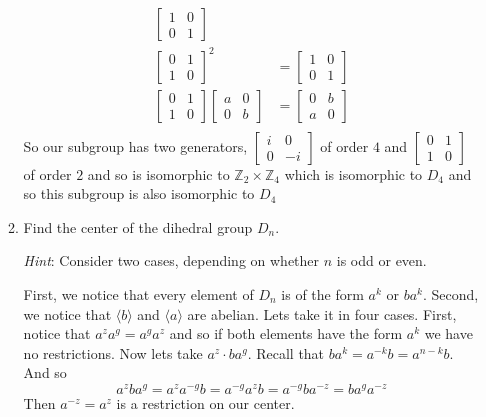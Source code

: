 \documentclass[letterpaper]{article}
\begin{document}
\begin{enumerate}
\begin{enumerate}
\begin{align*}
      \left[\begin{array}{cc}1&0\\0&1\end{array}\right]\\
      \left[\begin{array}{cc}0&1\\1&0\end{array}\right]^2&=\left[\begin{array}{cc}1&0\\0&1\end{array}\right]\\
      \left[\begin{array}{cc}0&1\\1&0\end{array}\right]\left[\begin{array}{cc}a&0\\0&b\end{array}\right]&=\left[\begin{array}{cc}0&b\\a&0\end{array}\right]\\
    \end{align*}
    So our subgroup has two generators, $\left[\begin{array}{cc}i&0\\0&-i\end{array}\right]$ of order $4$ and $\left[\begin{array}{cc}0&1\\1&0\end{array}\right]$ of order $2$ and so is isomorphic to $\mathbb{Z}_2\times\mathbb{Z}_4$ which is isomorphic to $D_4$ and so this subgroup is also isomorphic to $D_4$
  \setcounter{enumii}{20}
  \item
    Find the center of the dihedral group $D_n$.

    {\em Hint}: Consider two cases, depending on whether $n$ is odd or even.

    First, we notice that every element of $D_n$ is of the form $a^k$ or $ba^k$.
    Second, we notice that $\langle b\rangle$ and $\langle a\rangle$ are abelian.
    Lets take it in four cases.
    First, notice that $a^za^g=a^ga^z$ and so if both elements have the form $a^k$ we have no restrictions.
    Now lets take $a^z\cdot ba^g$.
    Recall that $ba^k=a^{-k}b=a^{n-k}b$.
    And so
    \[a^zba^g=a^za^{-g}b=a^{-g}a^zb=a^{-g}ba^{-z}=ba^{g}a^{-z}\]
    Then $a^{-z}=a^z$ is a restriction on our center.


\end{enumerate}
\end{enumerate}
\end{document}
